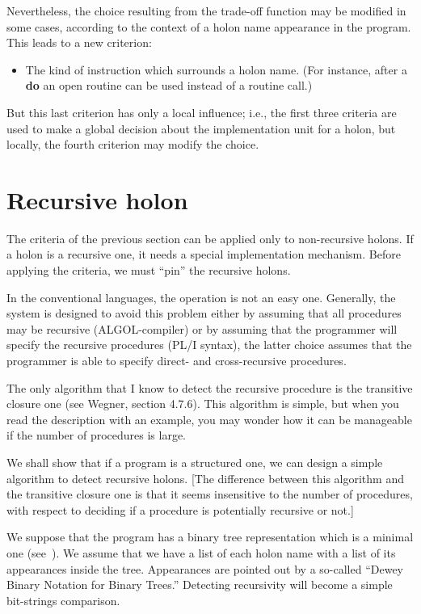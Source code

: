 \documentclass[openany,nobib]{tufte-book}
\newcommand{\kw}[1]{{\bf #1}}
\begin{document}
Nevertheless, the choice resulting from the trade-off function may be modified
in some cases, according to the context of a holon name appearance in the
program. This leads to a new criterion:
\begin{itemize}
    \item[4.] The kind of instruction which surrounds a holon name. (For
instance, after a \kw{do} an open routine can be used instead of a routine
call.)
\end{itemize}
But this last criterion has only a local influence; i.e., the first three
criteria are used to make a global decision about the implementation unit for a
holon, but locally, the fourth criterion may modify the choice.

\section{Recursive holon}

The criteria of the previous section can be applied only to non-recursive
holons. If a holon is a recursive one, it needs a special implementation
mechanism.\autocite{dijkstra1960recursive} Before applying the criteria, we
must ``pin'' the recursive holons.

In the conventional languages, the operation is not an easy one. Generally, the
system is designed to avoid this problem either by assuming that all procedures
may be recursive (ALGOL-compiler) or by assuming that the programmer will
specify the recursive procedures (PL/I syntax), the latter choice assumes that
the programmer is able to specify direct- and cross-recursive procedures.

The only algorithm that I know to detect the recursive procedure is the
transitive closure one (see Wegner, section
4.7.6).\autocite{wegner1968programming} This algorithm is simple, but when you
read the description with an example, you may wonder how it can be manageable
if the number of procedures is large.

We shall show that if a program is a structured one, we can design a simple
algorithm to detect recursive holons. [The difference between this algorithm
and the transitive closure one is that it seems insensitive to the number of
procedures, with respect to deciding if a procedure is potentially recursive or
not.]

We suppose that the program has a binary tree representation which is a minimal
one (see~). We assume that we have a list of
each holon name with a list of its appearances inside the tree. Appearances are
pointed out by a so-called ``Dewey Binary Notation for Binary
Trees.''\autocite{knuth1968art} Detecting recursivity will become a simple
bit-strings comparison.
\end{document}
